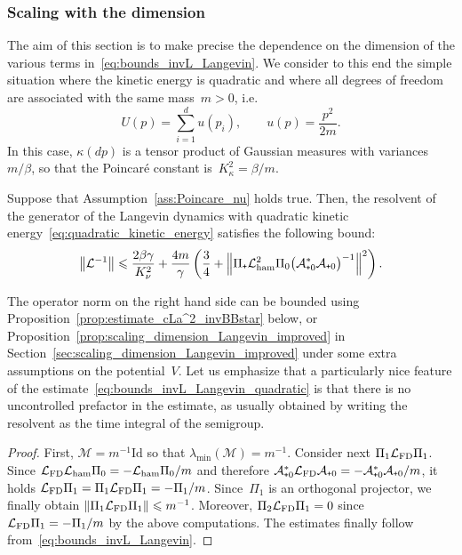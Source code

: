 \documentclass[10pt]{amsart}
\theoremstyle{definition}\newtheorem{defi}[theo]{Definition}\newtheorem{rema}[theo]{Remark}\newtheorem{exam}[theo]{Example}\newtheorem{exem}[theo]{Example}\newtheorem{nota}[theo]{Notation}
\newcommand{\Id}{\mathrm{Id}}
\newcommand{\cL}{\mathcal{L}}
\newcommand{\cLa}{\mathcal{A}}
\newcommand{\cLM}{\mathcal{M}}
\newcommand{\cLham}{\mathcal{L}_{\rm ham}}
\newcommand{\cLFD}{\mathcal{L}_{\rm FD}}
\newcommand{\subplus}{\textnormal{\texttt{+}}}
\renewcommand{\leq}{\leqslant}
\begin{document}
\subsubsection{Scaling with the dimension}\label{sec:scaling_dimension_Langevin}

The aim of this section is to make precise the dependence on the dimension of the various terms in~\eqref{eq:bounds_invL_Langevin}. We consider to this end the simple situation where the kinetic energy is quadratic and where all degrees of freedom are associated with the same mass~$m>0$, i.e.
\begin{equation}\label{eq:quadratic_kinetic_energy}
U(p) = \sum_{i=1}^d u(p_i), \qquad u(p) = \frac{p^2}{2m}.
\end{equation}
In this case, $\kappa(dp)$ is a tensor product of Gaussian measures with variances~$m/\beta$, so that the Poincaré constant is~$K_\kappa^2 = \beta/m$.

\begin{coro}\label{cor:Lang}
Suppose that Assumption~\ref{ass:Poincare_nu} holds true. Then, the resolvent of the generator of the Langevin dynamics with quadratic kinetic energy~\eqref{eq:quadratic_kinetic_energy} satisfies the following bound:
\begin{equation}\label{eq:bounds_invL_Langevin_quadratic}
\left\|\cL^{-1}\right\| \leq \frac{2\beta\gamma}{K_\nu^2} + \frac{4 m}{\gamma} \left(\frac34 + \left\| \Pi_\subplus \cLham^2 \Pi_0 \big(\cLa_{\subplus 0}^*\cLa_{\subplus 0}\big)^{-1} \right\|^2 \right).
\end{equation}
\end{coro}

The operator norm on the right hand side can be bounded using Proposition~\ref{prop:estimate_cLa^2_invBBstar} below, or Proposition~\ref{prop:scaling_dimension_Langevin_improved} in Section~\ref{sec:scaling_dimension_Langevin_improved} under some extra assumptions on the potential~$V$. Let us emphasize that a particularly nice feature of the estimate~\eqref{eq:bounds_invL_Langevin_quadratic} is that there is no uncontrolled prefactor in the estimate, as usually obtained by writing the resolvent as the time integral of the semigroup.

\begin{proof}
First, $\cLM = m^{-1} \Id$ so that $\lambda_{\min}(\cLM) = m^{-1}$. Consider next $\Pi_1 \cLFD \Pi_1$. Since $\cLFD \cLham \Pi_0 = -\cLham \Pi_0/m$ and therefore $\cLa_{\subplus 0}^{*}\cLFD \cLa_{\subplus 0} = -\cLa_{\subplus 0}^{*}\cLa_{\subplus 0}/m$, it holds $\cLFD\Pi_1 = \Pi_1 \cLFD \Pi_1= -\Pi_1/m$. Since~$\Pi_1$ is an orthogonal projector, we finally obtain $\|\Pi_1 \cLFD \Pi_1\| \leq m^{-1}$. Moreover, $\Pi_2 \cLFD \Pi_1 = 0$ since $\cLFD \Pi_1 = -\Pi_1/m$ by the above computations. The estimates finally follow from~\eqref{eq:bounds_invL_Langevin}.
\end{proof}
\end{document}
